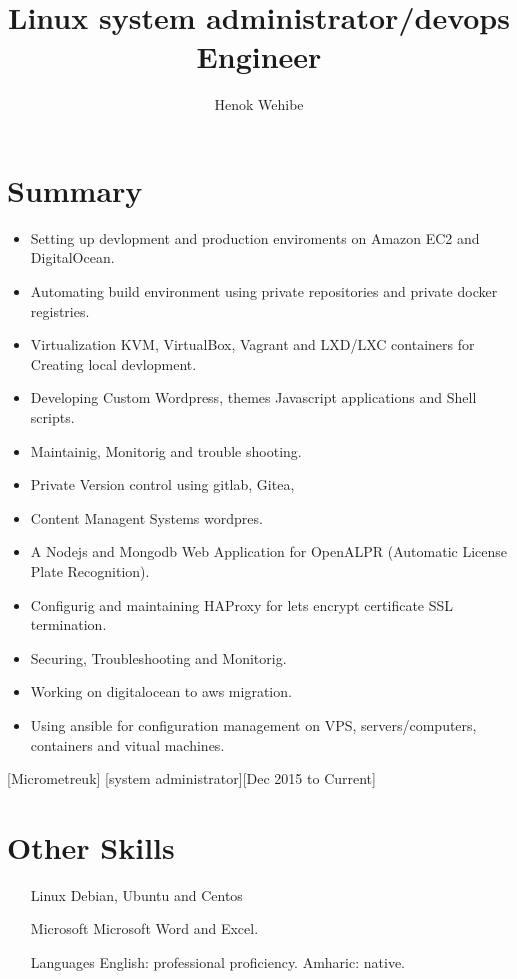 \documentclass{article}
\title{Linux system administrator/devops Engineer}
\author{Henok Wehibe}
\begin{document}
\maketitle %

\section{Summary}

\begin{itemize}
\item Setting up devlopment and production enviroments on Amazon EC2  and DigitalOcean.
\item Automating build environment using private repositories and private docker registries.
\item Virtualization  KVM, VirtualBox, Vagrant and LXD/LXC containers for Creating local devlopment.
\item Developing  Custom Wordpress, themes Javascript applications and Shell scripts. 
\item Maintainig, Monitorig and trouble shooting.
\item Private Version control using gitlab, Gitea, 
\item Content Managent Systems wordpres. 
\item A Nodejs and Mongodb Web Application for OpenALPR (Automatic License Plate Recognition).
\item Configurig and maintaining  HAProxy for lets encrypt certificate SSL termination.
\item Securing, Troubleshooting and Monitorig.
\item Working on digitalocean to aws migration.
\item Using ansible for configuration management on VPS, servers/computers,  containers and vitual machines.
\end{itemize}

[Micrometreuk]
[system administrator][Dec 2015 to Current]





\section{Other Skills}
\begin{itemize}
\item [Linux]Debian, Ubuntu and Centos
\item[Microsoft]Microsoft Word and Excel.
\item[Languages]English: professional proficiency.  Amharic: native.
\end{itemize}
\end{document}

